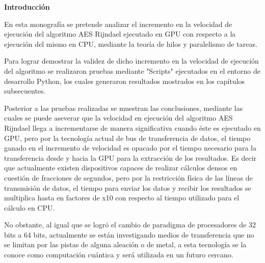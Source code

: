 \documentclass[../main/main.tex]{subfiles}
\begin{document}
  \begin{center}
    \textbf{\large Introducción}
  \end{center}

  En esta monografía se pretende analizar el incremento en la velocidad de ejecución del algoritmo AES Rijndael ejecutado en GPU con respecto a la ejecución del mismo en CPU, mediante la teoría de hilos y paralelismo de tareas.

  Para lograr demostrar la validez de dicho incremento en la velocidad de ejecución del algoritmo se realizaron pruebas mediante "Scripts" ejecutados en el entorno de desarrollo Python, los cuales generaron resultados mostrados en los capítulos subsecuentes.

  Posterior a las pruebas realizadas se muestran las conclusiones, mediante las cuales se puede aseverar que la velocidad en ejecución del algoritmo AES Rijndael llega a incrementarse de manera significativa cuando éste es ejecutado en GPU, pero por la tecnología actual de bus de transferencia de datos, el tiempo ganado en el incremento de velocidad es opacado por el tiempo necesario para la transferencia desde y hacia la GPU para la extracción de los resultados. Es decir que actualmente existen dispositivos capaces de realizar cálculos densos en cuestión de fracciones de segundos, pero por la restricción física de las líneas de transmisión de datos, el tiempo para enviar los datos y recibir los resultados se multiplica hasta en factores de x10 con respecto al tiempo utilizado para el cálculo en CPU.

  No obstante, al igual que se logró el cambio de paradigma de procesadores de 32 bits a 64 bits, actualmente se están investigando medios de transferencia que no se limitan por las pistas de alguna aleación o de metal, a esta tecnología se la conoce como computación cuántica y será utilizada en un futuro cercano.
\end{document}
